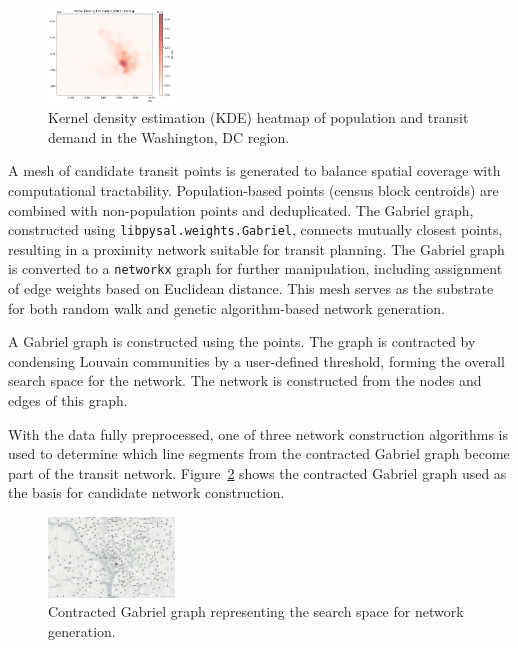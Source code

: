 \documentclass[sigconf,nonacm]{acmart}
\begin{document}
\begin{figure}[ht]
    \centering
    \includegraphics[width=0.3\textwidth]{./img/kde.png}
    \caption{Kernel density estimation (KDE) heatmap of population and transit demand in the Washington, DC region.}
    \label{fig:kde_heatmap}
\end{figure}



A mesh of candidate transit points is generated to balance spatial coverage with computational tractability. Population-based points (census block centroids) are combined with non-population points and deduplicated. The Gabriel graph, constructed using \texttt{libpysal.weights.Gabriel}, connects mutually closest points, resulting in a proximity network suitable for transit planning. The Gabriel graph is converted to a \texttt{networkx} graph for further manipulation, including assignment of edge weights based on Euclidean distance. This mesh serves as the substrate for both random walk and genetic algorithm-based network generation.

A Gabriel graph is constructed using the points. The graph is contracted by condensing Louvain communities by a user-defined threshold, forming the overall search space for the network. The network is constructed from the nodes and edges of this graph.

With the data fully preprocessed, one of three network construction algorithms is used to determine which line segments from the contracted Gabriel graph become part of the transit network. Figure~\ref{fig:contracted_gabriel} shows the contracted Gabriel graph used as the basis for candidate network construction.

\begin{figure}[ht]
    \centering
    \includegraphics[width=0.3\textwidth]{./img/graph.png}
    \caption{Contracted Gabriel graph representing the search space for network generation.}
    \label{fig:contracted_gabriel}
\end{figure}
\end{document}
